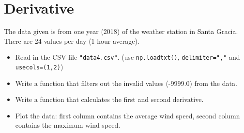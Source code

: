 \section{Derivative}

The data given is from one year (2018) of the weather station in Santa Gracia.
There are 24 values per day (1 hour average).

\begin{itemize}
    \item Read in the CSV file \verb|"data4.csv"|. (use \verb|np.loadtxt()|, \verb|delimiter=","| and \verb|usecols=(1,2)|)
    \item Write a function that filters out the invalid values (-9999.0) from the data.
    \item Write a function that calculates the first and second derivative.
    \item Plot the data: first column contains the average wind speed, second column contains the maximum wind speed.
\end{itemize}
